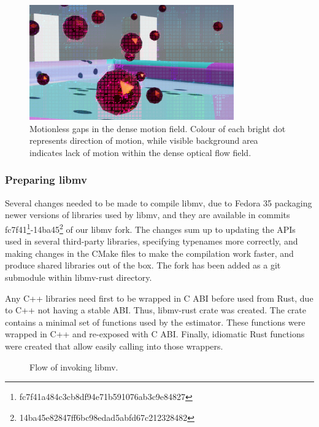 \documentclass[11pt,english]{report}
\begin{document}
\begin{figure}[!ht]
	\centering
	\includegraphics[width=250pt]{docs/report/mvec-gaps.jpg}
	\caption{\centering Motionless gaps in the dense motion field. Colour of each bright dot represents direction of motion, while visible background area indicates lack of motion within the dense optical flow field.}
\end{figure}

\subsubsection{Preparing libmv}

Several changes needed to be made to compile libmv, due to Fedora 35 packaging newer versions of libraries used by libmv, and they are available in commits fc7f41\footnote{fc7f41a484c3cb8df94e71b591076ab3c9e84827}-14ba45\footnote{14ba45e82847ff6bc98edad5abfd67c212328482} of our libmv fork\cite{libmv-fork}. The changes sum up to updating the APIs used in several third-party libraries, specifying typenames more correctly, and making changes in the CMake files to make the compilation work faster, and produce shared libraries out of the box. The fork has been added as a git submodule within libmv-rust directory.

Any C++ libraries need first to be wrapped in C ABI before used from Rust, due to C++ not having a stable ABI. Thus, libmv-rust crate was created. The crate contains a minimal set of functions used by the estimator. These functions were wrapped in C++ and re-exposed with C ABI. Finally, idiomatic Rust functions were created that allow easily calling into those wrappers.

\begin{figure}[!ht]
	\centering
	\caption{\centering Flow of invoking libmv.}
\end{figure}
\end{document}
